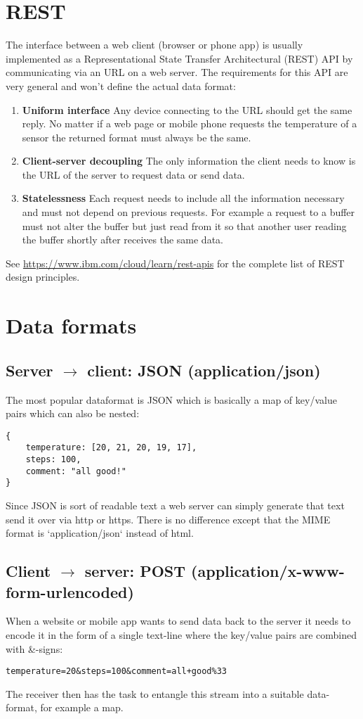 \documentclass[12pt]{report}
\begin{document}
\section{REST}
The interface between a web client (browser or phone app) is usually
implemented as a Representational State Transfer Architectural (REST)
API by communicating via an URL on a web server. The requirements
for this API are very general and won't define the actual data format:
\begin{enumerate}
\item\textbf{Uniform interface} Any device connecting to the URL should
  get the same reply. No matter if a web page or mobile phone
  requests the temperature of a sensor the returned format must always be the same.
\item\textbf{Client-server decoupling} The only information
  the client needs to know is the URL of the server to request data or send data.
\item\textbf{Statelessness} Each request needs to include all the
  information necessary and must not depend on previous requests. For
  example a request to a buffer must not alter the
  buffer but just read from it so that another user reading the buffer
  shortly after receives the same data.
\end{enumerate}
See \url{https://www.ibm.com/cloud/learn/rest-apis} for the complete
list of REST design principles.

\section{Data formats}
\subsection{Server $\to$ client: JSON (application/json)}
The most popular dataformat is JSON which is basically a
map of key/value pairs which can also be nested:
\begin{verbatim}
{
    temperature: [20, 21, 20, 19, 17],
    steps: 100,
    comment: "all good!"
}
\end{verbatim}
Since JSON is sort of readable text a web server can simply
generate that text send it over via http or https. There
is no difference except that the MIME format is `application/json`
instead of html.

\subsection{Client $\to$ server: POST (application/x-www-form-urlencoded)}
When a website or mobile app wants to send data back to the server it
needs to encode it in the form of a single text-line where the
key/value pairs are combined with \&-signs:
\begin{verbatim}
temperature=20&steps=100&comment=all+good%33
\end{verbatim}
The receiver then has the task to entangle this stream into a suitable data-format,
for example a map.
\end{document}
